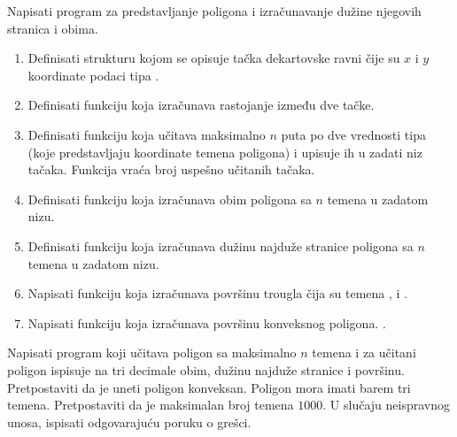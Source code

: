 \begin{Exercise}[label=struc.10] 
Napisati program za predstavljanje poligona i izračunavanje
dužine njegovih stranica i obima.
\begin{enumerate}
\item Definisati strukturu  kojom se opisuje
  tačka dekartovske ravni čije su $x$ i $y$ koordinate podaci tipa
  .

\item Definisati funkciju 
  koja izračunava rastojanje između dve tačke.

\item Definisati funkciju  koja učitava maksimalno $n$ puta po dve
  vrednosti tipa  (koje predstavljaju koordinate temena
  poligona) i upisuje ih u zadati niz tačaka. Funkcija vraća broj
  uspešno učitanih tačaka.

\item Definisati funkciju  koja izračunava obim poligona sa $n$ temena u zadatom nizu.

\item Definisati funkciju  koja izračunava dužinu najduže stranice
  poligona sa $n$ temena u zadatom nizu.

\item Napisati funkciju  
koja izračunava površinu trougla čija su temena ,  i .

\item Napisati funkciju  
koja izračunava površinu konveksnog poligona. .
\end{enumerate}
Napisati program koji učitava poligon sa maksimalno $n$ temena
  i za učitani poligon ispisuje na tri decimale
  obim, dužinu najduže stranice i površinu. Pretpostaviti da je
  uneti poligon konveksan. Poligon mora imati barem tri temena.
  Pretpostaviti da je maksimalan broj temena $1000$.
  U slučaju neispravnog unosa, ispisati odgovarajuću poruku o grešci.


\end{Exercise}
